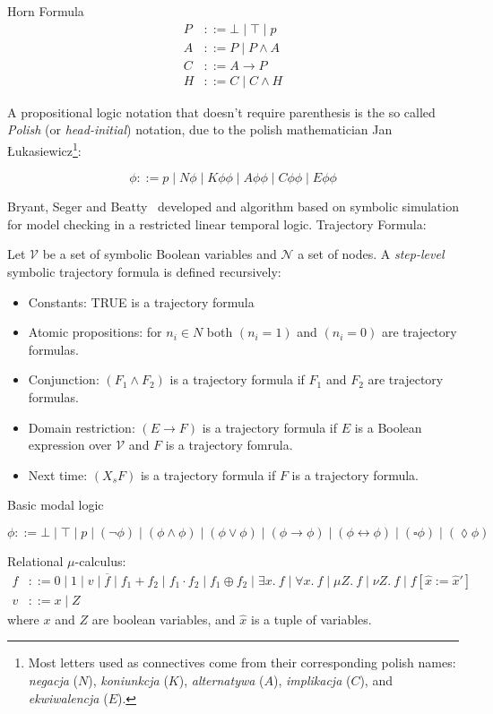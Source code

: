 \documentclass{article}
\begin{document}
Horn Formula
\begin{align*}
  P &::= \bot \mid \top \mid p \\
  A &::= P \mid P \land A \\
  C &::= A \to P \\
  H &::= C \mid C \land H
\end{align*}

A propositional logic notation that doesn't require parenthesis is the so
called \textit{Polish} (or \textit{head-initial}) notation, due to
the polish mathematician Jan Łukasiewicz\footnote{Most letters used as
connectives come from their corresponding polish names: \textit{negacja} (\(N\)),
\textit{koniunkcja} (\(K\)), \textit{alternatywa} (\(A\)),
\textit{implikacja} (\(C\)), and \textit{ekwiwalencja} (\(E\)).}:

\[
  \phi ::= p \mid N \phi \mid K \phi \phi \mid A \phi \phi \mid C \phi \phi \mid E \phi \phi
\]




Bryant, Seger and Beatty~\cite{BS90, BSB91} developed and algorithm based on
symbolic simulation for model checking in a restricted linear temporal logic.
Trajectory Formula:

Let \(\mathcal{V}\) be a set of symbolic Boolean variables and
\(\mathcal{N}\) a set of nodes.
A \textit{step-level} symbolic trajectory formula is defined recursively:
\begin{itemize}
  \item Constants: TRUE is a trajectory formula
  \item Atomic propositions: for \(n_i \in N\) both \((n_i = 1)\) and \((n_i = 0)\) are trajectory formulas.
  \item Conjunction: \((F_1 \land F_2)\) is a trajectory formula if \(F_1\) and \(F_2\) are trajectory formulas.
  \item Domain restriction: \((E \to F)\) is a trajectory formula if \(E\) is
  a Boolean expression over \(\mathcal{V}\) and \(F\) is a trajectory
  fomrula.
  \item Next time: \((X_s F)\) is a trajectory formula if \(F\) is a trajectory formula.
\end{itemize}

Basic modal logic

\[
  \phi ::= \bot \mid \top \mid p \mid (\neg \phi) \mid (\phi \land \phi) \mid (\phi \lor \phi) \mid (\phi \to \phi) \mid (\phi \leftrightarrow \phi) \mid (\square \phi) \mid (\lozenge \phi)
\]


Relational \(\mu\)-calculus:
  \begin{align*}
    f & ::= 0 \mid 1 \mid v \mid \overline{f} \mid f_1 + f_2 \mid f_1 \cdot f_2 \mid f_1 \oplus f_2 \mid \exists x.~f \mid \forall x.~f \mid \mu Z.~f \mid \nu Z.~f \mid f[\hat{x} := \hat{x}'] \\
    v & ::= x \mid Z
  \end{align*}
where \(x\) and \(Z\) are boolean variables, and \(\hat{x}\) is a tuple of variables.
\end{document}
